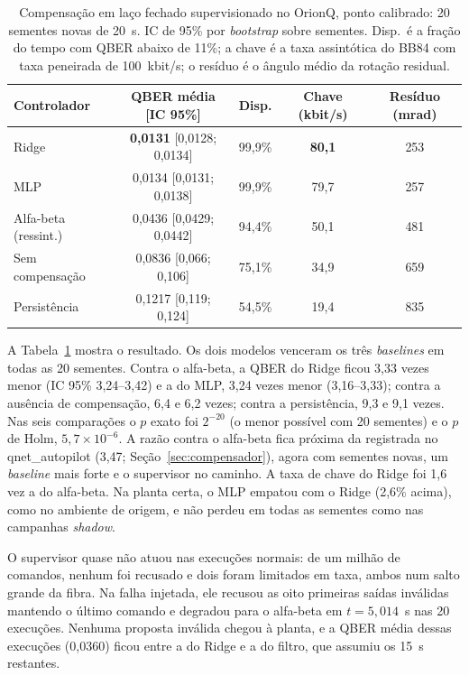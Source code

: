 \documentclass[12pt]{article}
\begin{document}
\begin{table}[ht]
\centering
\caption{Compensação em laço fechado supervisionado no OrionQ, ponto calibrado:
20 sementes novas de 20~s. IC de 95\% por \textit{bootstrap} sobre sementes.
Disp.\ é a fração do tempo com QBER abaixo de 11\%; a chave é a taxa
assintótica do BB84 com taxa peneirada de 100~kbit/s; o resíduo é o ângulo
médio da rotação residual.}
\label{tab:comp_lf}
\small
\begin{tabular}{lcccc}
\toprule
Controlador & QBER média [IC 95\%] & Disp. & Chave (kbit/s) & Resíduo (mrad) \\
\midrule
Ridge & \textbf{0,0131} [0,0128; 0,0134] & 99,9\% & \textbf{80,1} & 253 \\
MLP & 0,0134 [0,0131; 0,0138] & 99,9\% & 79,7 & 257 \\
Alfa-beta (ressint.) & 0,0436 [0,0429; 0,0442] & 94,4\% & 50,1 & 481 \\
Sem compensação & 0,0836 [0,066; 0,106] & 75,1\% & 34,9 & 659 \\
Persistência & 0,1217 [0,119; 0,124] & 54,5\% & 19,4 & 835 \\
\bottomrule
\end{tabular}
\end{table}

A Tabela~\ref{tab:comp_lf} mostra o resultado. Os dois modelos venceram os três
\textit{baselines} em todas as 20 sementes. Contra o alfa-beta, a QBER do Ridge
ficou 3,33 vezes menor (IC 95\% 3,24--3,42) e a do MLP, 3,24 vezes menor
(3,16--3,33); contra a ausência de compensação, 6,4 e 6,2 vezes; contra a
persistência, 9,3 e 9,1 vezes. Nas seis comparações o $p$ exato foi $2^{-20}$
(o menor possível com 20 sementes) e o $p$ de Holm, $5{,}7\times10^{-6}$. A
razão contra o alfa-beta fica próxima da registrada no qnet\_autopilot (3,47;
Seção~\ref{sec:compensador}), agora com sementes novas, um \textit{baseline} mais
forte e o supervisor no caminho. A taxa de chave do Ridge foi 1,6 vez a do
alfa-beta. Na planta certa, o MLP empatou com o Ridge (2,6\% acima), como no
ambiente de origem, e não perdeu em todas as sementes como nas campanhas
\textit{shadow}.

O supervisor quase não atuou nas execuções normais: de um milhão de comandos,
nenhum foi recusado e dois foram limitados em taxa, ambos num salto grande da
fibra. Na falha injetada, ele recusou as oito primeiras saídas inválidas mantendo
o último comando e degradou para o alfa-beta em $t=5{,}014$~s nas 20 execuções.
Nenhuma proposta inválida chegou à planta, e a QBER média dessas execuções
(0,0360) ficou entre a do Ridge e a do filtro, que assumiu os 15~s restantes.
\end{document}

